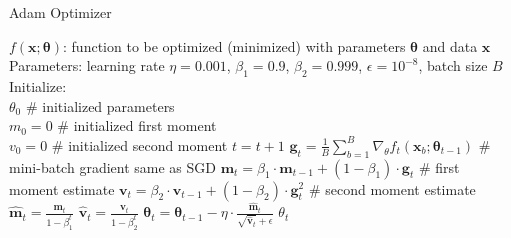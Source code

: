 \begin{algorithm}[H]
  \caption{Adam Optimizer \citep[Algorithm 1]{kingma2015}}
  \begin{algorithmic}[1]\label{algo:optimizer-adam}
    \Require $f \left(\mathbf{x}; \boldsymbol\theta\right)$:
    function to be optimized (minimized) with parameters $\boldsymbol\theta$ and data $\mathbf{x}$
    \Require Parameters: learning rate $\eta = 0.001$, $\beta_1 = 0.9$, $\beta_2 = 0.999$, $\epsilon = 10^{-8}$,
    batch size $B$
    \Require Initialize: \\
    $\theta_0$ \# initialized parameters\\
    $m_0 = 0$ \# initialized first moment\\
    $v_0 = 0$ \# initialized second moment
    \State $t = t + 1$
    \State $\mathbf{g}_t = \frac1B \sum_{b=1}^B \nabla_\theta f_t(\mathbf{x}_b; \boldsymbol\theta_{t-1})$
    \# mini-batch gradient same as SGD
    \State $\mathbf{m}_t = \beta_1 \cdot \mathbf{m}_{t-1} + (1 - \beta_1)\cdot \mathbf{g}_t$
    \# first moment estimate
    \State $\mathbf{v}_t = \beta_2 \cdot \mathbf{v}_{t-1} + (1 - \beta_2)\cdot \mathbf{g}_t^2$
    \# second moment estimate
    \State $\widehat{\mathbf{m}}_t = \frac{\mathbf{m}_t}{1 - \beta_1^t}$
    \State $\widehat{\mathbf{v}}_t = \frac{\mathbf{v}_t}{1 - \beta_2^t}$
    \State $\boldsymbol\theta_t = \boldsymbol\theta_{t-1} - \eta \cdot \frac{\widehat{\mathbf{m}}_t}{\sqrt{\widehat{\mathbf{v}}_t}+\epsilon}$
    \EndWhile
    \Ensure $\theta_t$
  \end{algorithmic}
\end{algorithm}


